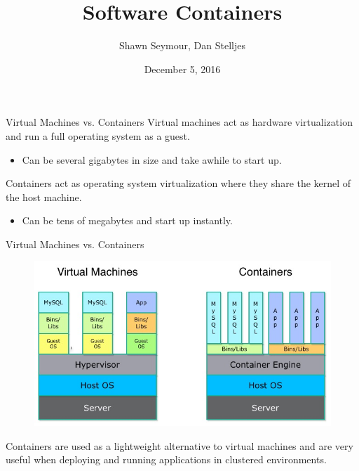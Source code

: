 \documentclass[xcolor=dvipsnames,aspectratio=1610]{beamer}
\title{Software Containers}
\date{December 5, 2016}
\author{Shawn Seymour, Dan Stelljes}
\begin{document}
  \maketitle
  \begin{frame}{Virtual Machines vs. Containers}
      \alert{Virtual machines} act as hardware virtualization and run a full operating system as a guest.
      \begin{itemize}
          \item Can be several gigabytes in size and take awhile to start up.
      \end{itemize}
      \vspace{10px}

      \alert{Containers} act as operating system virtualization where they share the kernel of the host machine.
      \begin{itemize}
          \item Can be tens of megabytes and start up instantly.
      \end{itemize}

  \end{frame}

  \begin{frame}{Virtual Machines vs. Containers}
      \begin{figure}
        \includegraphics[scale=0.5]{container_vs_vm.jpg}
      \end{figure}
      Containers are used as a lightweight alternative to virtual machines and are very useful when deploying and running applications in clustered environments.

    \end{frame}
\end{document}
